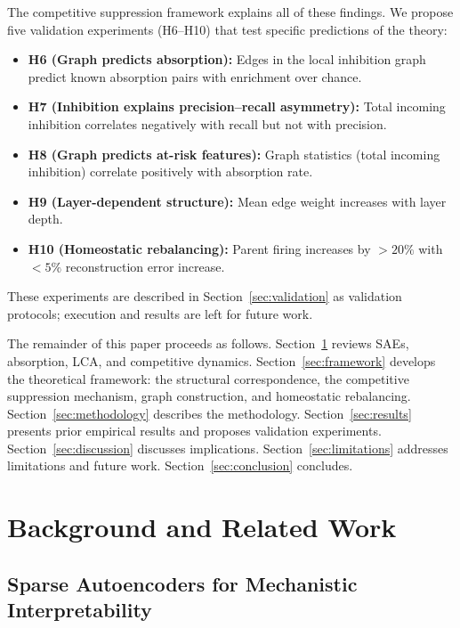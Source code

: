 \documentclass{article}
\begin{document}
The competitive suppression framework explains all of these findings. We propose five validation experiments (H6--H10) that test specific predictions of the theory:
\begin{itemize}
    \item \textbf{H6 (Graph predicts absorption):} Edges in the local inhibition graph predict known absorption pairs with enrichment over chance.
    \item \textbf{H7 (Inhibition explains precision--recall asymmetry):} Total incoming inhibition correlates negatively with recall but not with precision.
    \item \textbf{H8 (Graph predicts at-risk features):} Graph statistics (total incoming inhibition) correlate positively with absorption rate.
    \item \textbf{H9 (Layer-dependent structure):} Mean edge weight increases with layer depth.
    \item \textbf{H10 (Homeostatic rebalancing):} Parent firing increases by $>20\%$ with $<5\%$ reconstruction error increase.
\end{itemize}
These experiments are described in Section~\ref{sec:validation} as validation protocols; execution and results are left for future work.

The remainder of this paper proceeds as follows. Section~\ref{sec:background} reviews SAEs, absorption, LCA, and competitive dynamics. Section~\ref{sec:framework} develops the theoretical framework: the structural correspondence, the competitive suppression mechanism, graph construction, and homeostatic rebalancing. Section~\ref{sec:methodology} describes the methodology. Section~\ref{sec:results} presents prior empirical results and proposes validation experiments. Section~\ref{sec:discussion} discusses implications. Section~\ref{sec:limitations} addresses limitations and future work. Section~\ref{sec:conclusion} concludes.

\section{Background and Related Work}
\label{sec:background}

\subsection{Sparse Autoencoders for Mechanistic Interpretability}
\end{document}
